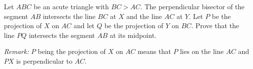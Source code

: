 Let $ABC$ be an acute triangle with $BC > AC$.
The perpendicular bisector of the segment $AB$ intersects the line $BC$ at $X$ and the line $AC$ at $Y$.
Let $P$ be the projection of $X$ on $AC$ and let $Q$ be the projection of $Y$ on $BC$.
Prove that the line $PQ$ intersects the segment $AB$ at its midpoint.

\emph{Remark:} $P$ being the projection of $X$ on $AC$ means that
$P$ lies on the line $AC$ and $PX$ is perpendicular to $AC$.
